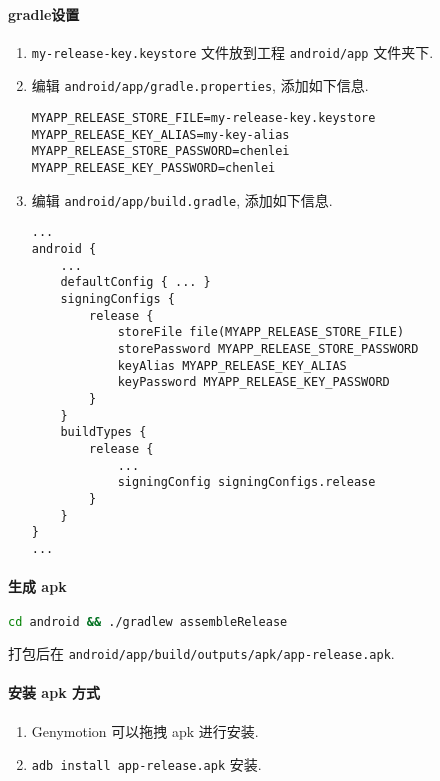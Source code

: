 \paragraph{gradle设置}\label{gradleux8bbeux7f6e}

\begin{enumerate}
\def\labelenumi{\arabic{enumi}.}
\item
  \lstinline!my-release-key.keystore! 文件放到工程
  \lstinline!android/app! 文件夹下.
\item
  编辑 \lstinline!android/app/gradle.properties!, 添加如下信息.

\begin{lstlisting}
MYAPP_RELEASE_STORE_FILE=my-release-key.keystore
MYAPP_RELEASE_KEY_ALIAS=my-key-alias
MYAPP_RELEASE_STORE_PASSWORD=chenlei
MYAPP_RELEASE_KEY_PASSWORD=chenlei
\end{lstlisting}
\item
  编辑 \lstinline!android/app/build.gradle!, 添加如下信息.

\begin{lstlisting}
...
android {
    ...
    defaultConfig { ... }
    signingConfigs {
        release {
            storeFile file(MYAPP_RELEASE_STORE_FILE)
            storePassword MYAPP_RELEASE_STORE_PASSWORD
            keyAlias MYAPP_RELEASE_KEY_ALIAS
            keyPassword MYAPP_RELEASE_KEY_PASSWORD
        }
    }
    buildTypes {
        release {
            ...
            signingConfig signingConfigs.release
        }
    }
}
...
\end{lstlisting}
\end{enumerate}

\paragraph{生成 apk}\label{ux751fux6210-apk}

\begin{lstlisting}[language=bash]
cd android && ./gradlew assembleRelease
\end{lstlisting}

打包后在 \lstinline!android/app/build/outputs/apk/app-release.apk!.

\paragraph{安装 apk 方式}\label{ux5b89ux88c5-apk-ux65b9ux5f0f}

\begin{enumerate}
\def\labelenumi{\arabic{enumi}.}
\tightlist
\item
  Genymotion 可以拖拽 apk 进行安装.
\item
  \lstinline!adb install app-release.apk! 安装.
\end{enumerate}

